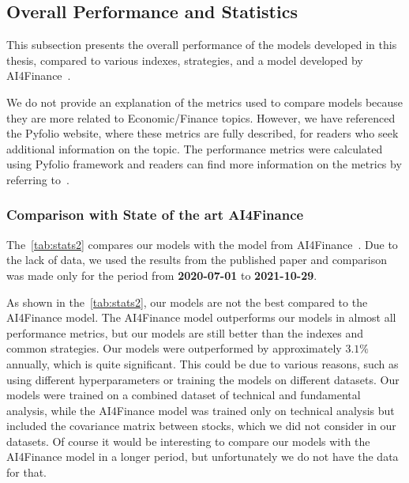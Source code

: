 \documentclass[../xlapes02]{subfiles}
\begin{document}
    \subsection{Overall Performance and Statistics}\label{subsec:overall-performance-and-statistics}
    This subsection presents the overall performance of the models developed in this thesis, compared to various indexes, strategies, and a model developed by AI4Finance~\cite{finrl-portfolio-allocation-2020}.

    We do not provide an explanation of the metrics used to compare models because they are more related to Economic/Finance topics. However, we have referenced the Pyfolio website, where these metrics are fully described, for readers who seek additional information on the topic. The performance metrics were calculated using Pyfolio framework and readers can find more information on the metrics by referring to~\cite{Pyfolio, Pyfolio-return-analysis}.

    \subsubsection{Comparison with State of the art AI4Finance}\label{subsubsec:ai4finance-model}
    The~\cref{tab:stats2} compares our models with the model from AI4Finance~\cite{finrl-portfolio-allocation-2020}. Due to the lack of data, we used the results from the published paper and comparison was made only for the period from \textbf{2020-07-01} to \textbf{2021-10-29}.

    As shown in the~\cref{tab:stats2}, our models are not the best compared to the AI4Finance model. The AI4Finance model outperforms our models in almost all performance metrics, but our models are still better than the indexes and common strategies. Our models were outperformed by approximately $3.1\%$ annually, which is quite significant. This could be due to various reasons, such as using different hyperparameters or training the models on different datasets. Our models were trained on a combined dataset of technical and fundamental analysis, while the AI4Finance model was trained only on technical analysis but included the covariance matrix between stocks, which we did not consider in our datasets. Of course it would be interesting to compare our models with the AI4Finance model in a longer period, but unfortunately we do not have the data for that.
\end{document}
